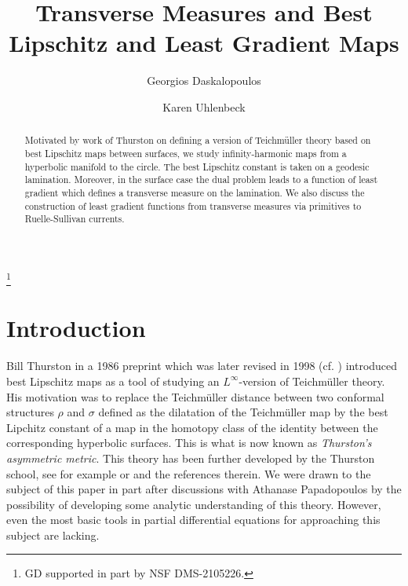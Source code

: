 \documentclass{ip-journal}
\theoremstyle{definition}
\numberwithin{equation}{section}
\begin{document}
\title[Transverse measures]{Transverse Measures and Best Lipschitz and Least Gradient Maps}
\author[Daskalopoulos]{Georgios Daskalopoulos}
\address{Department of Mathematics 
                 Brown University, 
                 Providence, RI}%
\author[Uhlenbeck]{Karen Uhlenbeck}
\address{Department of Mathematics University of Texas, Austin, TX and Distinguished Visiting Professor Institute for Advanced Study, Princeton, NJ}

\thanks{
GD supported in part by NSF DMS-2105226.}
\maketitle

\begin{abstract}
Motivated by  work of Thurston on defining a version of Teichm\"uller theory based on best Lipschitz maps between surfaces, we study infinity-harmonic  maps from a hyperbolic manifold to the circle. The best Lipschitz constant is taken on a geodesic lamination.  Moreover, in the surface case the dual problem leads to a function of least gradient  which defines a transverse measure on the lamination.  We also discuss  the construction of least gradient functions from transverse measures via primitives to Ruelle-Sullivan currents.
\end{abstract}

\section{Introduction}

Bill Thurston  in a 1986 preprint which was later revised in 1998 (cf. \cite{thurston})  introduced best Lipschitz maps as a tool of studying an $L^\infty$-version of Teichm\"uller theory. His motivation was to replace the Teichm\"uller distance between two conformal structures $\rho$ and $\sigma$  defined as the dilatation of the Teichm\"uller map by the best Lipchitz constant of a map in the homotopy class of the identity between the corresponding hyperbolic surfaces.  This is what is now known as {\it Thurston's asymmetric metric}. This theory has been further developed by the Thurston school, see for example \cite{papa} or \cite{kassel} and the references therein. We were drawn to  the subject of this paper in part after discussions with Athanase Papadopoulos by the possibility of developing some analytic understanding of this theory. However, even the most basic tools in partial differential equations for approaching this subject are lacking. 
\end{document}
